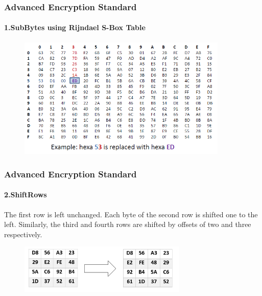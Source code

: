 \begin{frame}
	\frametitle{Advanced Encryption Standard}
		\framesubtitle{1.SubBytes using Rijndael S-Box Table}
	\vspace{0.5cm}
		\begin{figure}
		\centering
		\includegraphics[width=10cm]{sbox}
		\label{fig:obrazek sbox}
	\end{figure}
\end{frame}

\begin{frame}
	\frametitle{Advanced Encryption Standard}
		\framesubtitle{2.ShiftRows}
	\vfill
	\vspace{-0.5cm}
	\begin{block}{}
\footnotesize {The first row is left unchanged. Each byte of the second row is shifted one to the left. Similarly, the third and fourth rows are shifted by offsets of two and three respectively.}
	\end{block}
		\begin{figure}
		\centering
		\includegraphics[width=8cm]{shiftrows}
		\label{fig:obrazek shiftrows}
	\end{figure}
\end{frame}

